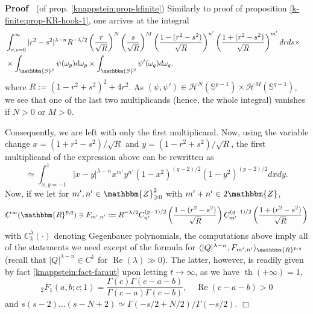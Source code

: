 \documentclass{article}
\newcommand{\assign}{:=}
\newcommand{\nocomma}{}
\newcommand{\tmop}[1]{\ensuremath{\operatorname{#1}}}
\newenvironment{proof}{\noindent\textbf{Proof\ }}{\hspace*{\fill}$\Box$\medskip}
\numberwithin{definition}{section}
\numberwithin{lemma}{section}
\numberwithin{proposition}{section}
{\theorembodyfont{\rmfamily}\newtheorem{remark}{Remark}
\numberwithin{remark}{section}
}
\begin{document}
\begin{proof}
  (of prop. \ref{knappstein:prop-kfinite}) Similarly to proof of proposition
  \ref{k-finite:prop-KR-hook-1}, one arrives at the integral
  \begin{eqnarray*}
    & \int_{r, s = 0}^{\infty} | r^2 - s^2 |^{\lambda - n} R^{- \lambda / 2}
    \left( \frac{r}{\sqrt{R}} \right)^N \left( \frac{s}{\sqrt{R}} \right)^M
    \left( \frac{1 - ( r^2 - s^2)}{\sqrt{R}} \right)^{n'} \left( \frac{1 + (
    r^2 - s^2)}{\sqrt{R}} \right)^{m'} d r d s \times & \\
    & \times \int_{\mathbbm{S}^p} \psi ( \omega_p) d \omega_p \times
    \int_{\mathbbm{S}^q} \psi' ( \omega_q) d \omega_q . & 
  \end{eqnarray*}
  where $R \assign ( 1 - r^2 + s^2)^2 + 4 r^2$. As $(\psi, \psi') \in
  \mathcal{H}^N ( \mathbb{S}^{p - 1}) \times \mathcal{H}^M ( \mathbb{S}^{q -
  1}) \nocomma$, we see that one of the last two multiplicands (hence, the
  whole integral) vanishes if $N > 0$ or $M > 0$.
  
  Consequently, we are left with only the first multiplicand. Now, using the
  variable change $x = ( 1 + r^2 - s^2) / \sqrt{R}$ and $y = ( 1 - r^2 + s^2)
  / \sqrt{R}$, the first multiplicand of the expression above can be rewritten
  as
  \[ \simeq \int_{x, y = - 1}^1 | x - y |^{\lambda - n} x^{m'} y^{n'} ( 1 -
     x^2)^{( q - 2) / 2} ( 1 - y^2)^{( p - 2) / 2} d x d y. \]
  Now, if we let for $m', n' \in \mathbbm{Z}_{\geqslant 0}^2$ with $m' + n'
  \in 2\mathbbm{Z}$,
  \[ C^{\infty} ( \mathbbm{R}^{p, q}) \ni F_{m', n'} \assign R^{- \lambda / 2}
     C_{n'}^{( p - 1) / 2} \left( \frac{1 - ( r^2 - s^2)}{\sqrt{R}} \right)
     C_{m'}^{( q - 1) / 2} \left( \frac{1 + ( r^2 - s^2)}{\sqrt{R}} \right) \]
  with $C^{\lambda}_k ( \cdot)$ denoting Gegenbauer polynomials, the
  computations above imply all of the statements we need except of the formula
  for $\langle | Q |^{\lambda - n}, F_{m', n'} \rangle_{\mathbbm{R}^{p, q}}$
  (recall that $| Q |^{\lambda - n} \in C^1$ for $\tmop{Re} ( \lambda) \gg
  0$). The latter, however, is readily given by fact
  \ref{knappstein:fact-faraut} upon letting $t \rightarrow \infty$, as we have
  $\tmop{th} ( + \infty) = 1$,
  \[ _2 F_1 ( a, b ; c ; 1) = \frac{\Gamma ( c) \Gamma ( c - a - b)}{\Gamma (
     c - a) \Gamma ( c - b)}, \hspace{1em} \tmop{Re} ( c - a - b) > 0 \]
  and $s ( s - 2) \ldots ( s - N + 2) \simeq \Gamma ( - s / 2 + N / 2) /
  \Gamma ( - s / 2)$.
\end{proof}
\end{document}
